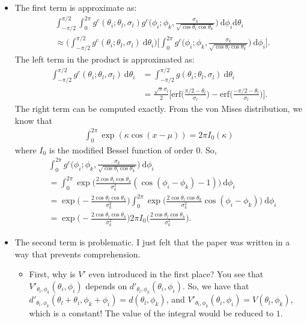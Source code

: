 \documentclass[10pt]{article}
\newcommand{\dee}{\mathrm{d}}
\begin{document}
\begin{itemize}
    \item The first term is approximate as:
    \begin{align*}
      & \int_{-\pi/2}^{\pi/2} \int_{0}^{2\pi} g^c(\theta_i;\theta_l,\sigma_l) g^c\bigg(\phi_i; \phi_k, \frac{\sigma_k}{\sqrt{\cos\theta_i\cos\theta_k}}\bigg)\ \dee\phi_i \dee\theta_i \\
      &\approx \bigg( \int_{-\pi/2}^{\pi/2} g^c(\theta_i;\theta_l,\sigma_l)\ \dee \theta_i \bigg) \bigg[ \int_{0}^{2\pi}g^c\bigg( \phi_i; \phi_k, \frac{\sigma_k}{\sqrt{\cos\theta_l \cos\theta_k}} \bigg) \ \dee\phi_i \bigg].      
    \end{align*}
    The left term in the product is approximated as:
    \begin{align*}
      \int_{-\pi/2}^{\pi/2} g^c(\theta_i;\theta_l, \sigma_l)\ \dee\theta_i
      &= \int_{-\pi/2}^{\pi/2} g(\theta_i;\theta_l, \sigma_l)\ \dee\theta_i \\
      &= \frac{\sqrt{\pi} \sigma_l}{2} \bigg[ \mathrm{erf}\bigg( \frac{\pi/2 - \theta_l}{\sigma_l} \bigg) - \mathrm{erf}\bigg( \frac{-\pi/2 - \theta_l}{\sigma_l} \bigg) \bigg].
    \end{align*}
    The right term can be computed exactly.  From the von Mises distribution, we know that
    \begin{align*}
      \int_{0}^{2\pi} \exp(\kappa \cos(x - \mu)) = 2\pi I_0(\kappa)
    \end{align*}
    where $I_0$ is the modified Bessel function of order $0$.  So,
    \begin{align*}
      & \int_0^{2\pi} g^c\bigg( \phi_i; \phi_k, \frac{\sigma_k}{\sqrt{\cos\theta_l\cos\theta_k}} \bigg)\ \dee\phi_i \\
      &= \int_0^{2\pi} \exp\bigg(\frac{2 \cos\theta_l \cos\theta_k}{\sigma^2_k} (\cos(\phi_i - \phi_k) - 1) \bigg) \ \dee\phi_i \\
      &= \exp \bigg(-\frac{2 \cos\theta_l \cos\theta_k}{\sigma^2_k} \bigg)
      \int_0^{2\pi} \exp\bigg(\frac{2 \cos\theta_l \cos\theta_k}{\sigma^2_k} \cos(\phi_i - \phi_k) \bigg) \ \dee\phi_i \\
      &= \exp \bigg(-\frac{2 \cos\theta_l \cos\theta_k}{\sigma^2_k} \bigg) 2\pi I_0\bigg( \frac{2 \cos\theta_l \cos\theta_k}{\sigma^2_k} \bigg).
    \end{align*}

    \item The second term is problematic.  I just felt that the paper was written in a way that prevents comprehension.
    \begin{itemize}
      \item First, why is $V'$ even introduced in the first place?  You see that $V'_{\theta_l,\phi_k}(\theta_i,\phi_i)$ depends on $d'_{\theta_l,\phi_k}(\theta_i, \phi_i)$.  So, we have that $d'_{\theta_l,\phi_k}(\theta_l + \theta_i,\phi_k + \phi_i) = d(\theta_l, \phi_k)$, and $V'_{\theta_l, \phi_k}(\theta_i, \phi_i) = V(\theta_l, \phi_k)$, which is a constant!  The value of the integral would be reduced to $1$.


\end{itemize}
\end{itemize}
\end{document}
